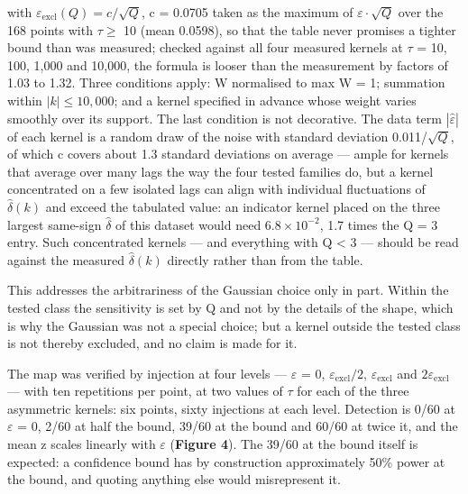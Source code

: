 \documentclass[
  11pt,
]{article}
\begin{document}
with \(\varepsilon_{\mathrm{excl}}(Q)=c/\sqrt{Q}\), c = 0.0705 taken as
the maximum of \(\varepsilon\cdot\sqrt{Q}\) over the 168 points with
\(\tau \ge\) 10 (mean 0.0598), so that the table never promises a
tighter bound than was measured; checked against all four measured
kernels at \(\tau\) = 10, 100, 1,000 and 10,000, the formula is looser
than the measurement by factors of 1.03 to 1.32. Three conditions apply:
W normalised to max W = 1; summation within \(|k| \le 10{,}000\); and a
kernel specified in advance whose weight varies smoothly over its
support. The last condition is not decorative. The data term
\(|\hat\varepsilon|\) of each kernel is a random draw of the noise with
standard deviation 0.011/\(\sqrt{Q}\), of which c covers about 1.3
standard deviations on average --- ample for kernels that average over
many lags the way the four tested families do, but a kernel concentrated
on a few isolated lags can align with individual fluctuations of
\(\hat\delta(k)\) and exceed the tabulated value: an indicator kernel
placed on the three largest same-sign \(\hat\delta\) of this dataset
would need \(6.8 \times 10^{-2}\), 1.7 times the Q = 3 entry. Such
concentrated kernels --- and everything with Q \textless{} 3 --- should
be read against the measured \(\hat\delta(k)\) directly rather than from
the table.

This addresses the arbitrariness of the Gaussian choice only in part.
Within the tested class the sensitivity is set by Q and not by the
details of the shape, which is why the Gaussian was not a special
choice; but a kernel outside the tested class is not thereby excluded,
and no claim is made for it.

The map was verified by injection at four levels --- \(\varepsilon\) =
0, \(\varepsilon_{\mathrm{excl}}/2\), \(\varepsilon_{\mathrm{excl}}\)
and \(2\varepsilon_{\mathrm{excl}}\) --- with ten repetitions per point,
at two values of \(\tau\) for each of the three asymmetric kernels: six
points, sixty injections at each level. Detection is 0/60 at
\(\varepsilon\) = 0, 2/60 at half the bound, 39/60 at the bound and
60/60 at twice it, and the mean z scales linearly with \(\varepsilon\)
(\textbf{Figure 4}). The 39/60 at the bound itself is expected: a
confidence bound has by construction approximately 50\% power at the
bound, and quoting anything else would misrepresent it.
\end{document}
